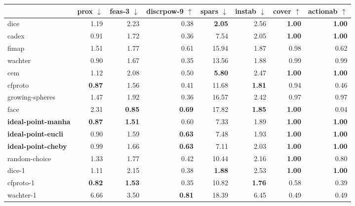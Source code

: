 \begin{tabular}{lrrrrrrr} \hline
 & prox $\downarrow$& feas-3 $\downarrow$& discrpow-9 $\uparrow$& spars $\downarrow$& instab $\downarrow$& cover $\uparrow$& actionab $\uparrow$\\ \hline
dice & 1.19 & 2.23 & 0.38 & \bfseries 2.05 & 2.56 & \bfseries 1.00 & \bfseries 1.00 \\ \hline
cadex & 0.91 & 1.72 & 0.36 & 7.54 & 2.05 & \bfseries 1.00 & \bfseries 1.00 \\ \hline
fimap & 1.51 & 1.77 & 0.61 & 15.94 & 1.87 & 0.98 & 0.62 \\ \hline
wachter & 0.90 & 1.67 & 0.35 & 13.56 & 1.88 & 0.99 & 0.99 \\ \hline
cem & 1.12 & 2.08 & 0.50 & \bfseries 5.80 & 2.47 & \bfseries 1.00 & \bfseries 1.00 \\ \hline
cfproto & \bfseries 0.87 & 1.56 & 0.41 & 11.68 & \bfseries 1.81 & 0.94 & 0.46 \\ \hline
growing-spheres & 1.47 & 1.92 & 0.36 & 16.57 & 2.42 & 0.97 & 0.97 \\ \hline
face & 2.31 & \bfseries 0.85 & \bfseries 0.69 & 17.82 & \bfseries 1.85 & \bfseries 1.00 & 0.04 \\ \hline
\bfseries ideal-point-manha & \bfseries 0.87 & \bfseries 1.51 & 0.60 & 7.33 & 1.89 & \bfseries 1.00 & \bfseries 1.00 \\ \hline
\bfseries ideal-point-eucli & 0.90 & 1.59 & \bfseries 0.63 & 7.48 & 1.93 & \bfseries 1.00 & \bfseries 1.00 \\ \hline
\bfseries ideal-point-cheby & 0.99 & 1.66 & \bfseries 0.63 & 7.11 & 2.03 & \bfseries 1.00 & \bfseries 1.00 \\ \hline
random-choice & 1.33 & 1.77 & 0.42 & 10.44 & 2.16 & \bfseries 1.00 & 0.80 \\ \hline
dice-1 & 1.11 & 2.15 & 0.38 & \bfseries 1.88 & 2.53 & \bfseries 1.00 & \bfseries 1.00 \\ \hline
cfproto-1 & \bfseries 0.82 & \bfseries 1.53 & 0.35 & 10.82 & \bfseries 1.76 & 0.58 & 0.39 \\ \hline
wachter-1 & 6.66 & 3.50 & \bfseries 0.81 & 18.39 & 6.45 & 0.49 & 0.49 \\ \hline
\end{tabular}
